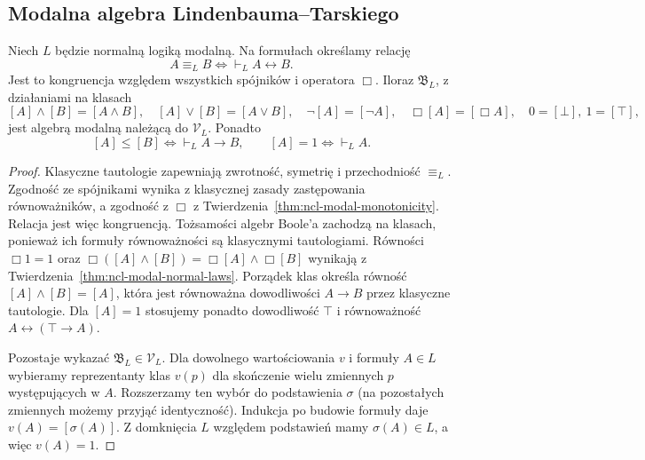 \subsection{Modalna algebra Lindenbauma--Tarskiego}

\begin{twierdzenie}
\label{thm:ncl-modal-lindenbaum}
Niech $L$ będzie normalną logiką modalną.
Na formułach określamy relację
\[
 A\equiv_L B\iff\vdash_L A\leftrightarrow B.
\]
Jest to kongruencja względem wszystkich spójników
i operatora $\Box$. Iloraz $\mathfrak B_L$,
z działaniami na klasach
\[
 [A]\wedge[B]=[A\wedge B],\quad
 [A]\vee[B]=[A\vee B],\quad
 \neg[A]=[\neg A],\quad \Box[A]=[\Box A],
 \quad 0=[\bot],\ 1=[\top],
\]
jest algebrą modalną należącą do $\mathcal V_L$.
Ponadto
\[
 [A]\leq[B]\iff\vdash_L A\to B,\qquad
 [A]=1\iff\vdash_L A.
\]
\end{twierdzenie}
\begin{proof}
Klasyczne tautologie zapewniają zwrotność,
symetrię i przechodniość $\equiv_L$.
Zgodność ze spójnikami wynika z klasycznej
zasady zastępowania równoważników, a zgodność
z $\Box$ z
Twierdzenia~\ref{thm:ncl-modal-monotonicity}.
Relacja jest więc kongruencją.
Tożsamości algebr Boole'a zachodzą na klasach,
ponieważ ich formuły równoważności są
klasycznymi tautologiami.
Równości $\Box1=1$ oraz
$\Box([A]\wedge[B])=\Box[A]\wedge\Box[B]$
wynikają z Twierdzenia~\ref{thm:ncl-modal-normal-laws}.
Porządek klas określa równość
$[A]\wedge[B]=[A]$, która jest równoważna
dowodliwości $A\to B$ przez klasyczne
tautologie. Dla $[A]=1$ stosujemy ponadto
dowodliwość $\top$ i równoważność
$A\leftrightarrow(\top\to A)$.

Pozostaje wykazać $\mathfrak B_L\in\mathcal V_L$.
Dla dowolnego wartościowania $v$ i formuły
$A\in L$ wybieramy reprezentanty klas
$v(p)$ dla skończenie wielu zmiennych $p$
występujących w $A$. Rozszerzamy ten wybór
do podstawienia $\sigma$ (na pozostałych
zmiennych możemy przyjąć identyczność).
Indukcja po budowie formuły daje
$v(A)=[\sigma(A)]$.
Z domknięcia $L$ względem podstawień
mamy $\sigma(A)\in L$, a więc $v(A)=1$.
\end{proof}

